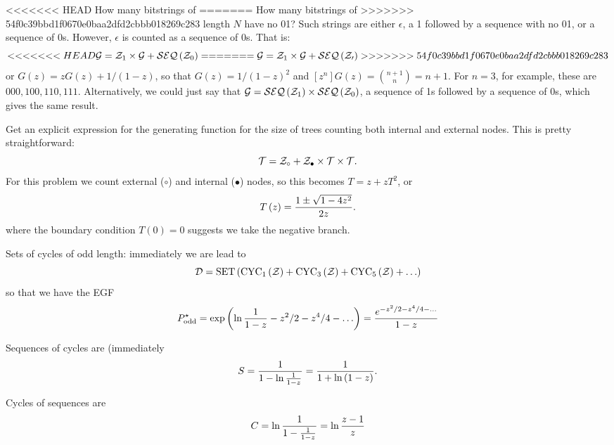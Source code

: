 <<<<<<< HEAD
\vskip 0.08in  How many bitstrings of
=======
\vskip 0.08in  How many bitstrings of
>>>>>>> 54f0c39bbd1f0670e0baa2dfd2cbbb018269c283
length $N$ have no 01?\hfil\break
Such strings are either $\epsilon$, a 1 followed by a sequence with no 01,
or a sequence of 0s.  However, $\epsilon$ is counted as a sequence of 0s. That is:
$$
<<<<<<< HEAD
 {\cal G} = {\cal Z}_1 \times {\cal G} + {\cal SEQ}\left({\cal Z}_0\right)
=======
 {\cal G} = {\cal Z}_1 \times {\cal G} + {\cal SEQ}\left({\cal Z_0}\right)
>>>>>>> 54f0c39bbd1f0670e0baa2dfd2cbbb018269c283
$$
or $G\left(z\right) = z G\left(z\right) + 1 /\left( 1 - z \right) $, so that
$G\left(z\right) = 1 / \left(1 - z\right)^2$ and $\left[z^n\right] G\left(z\right) =
{n + 1 \choose n} = n + 1$.  For $n=3$, for example, these are
$000, 100, 110, 111$.  Alternatively, we could just say that
${\cal G} = {\cal SEQ}\left({\cal Z}_1\right) \times {\cal SEQ}\left({\cal Z}_0\right)$,
a sequence of 1s followed by a sequence of 0s, which gives the same result.

\vskip 0.08in  Get an explicit expression for the 
generating function for the size of trees counting both internal and external nodes.
This is pretty straightforward: 
$$
 {\cal T} = {\cal Z}_{\circ} + {\cal Z}_{\bullet} \times {\cal T} \times {\cal T}.
$$
For this problem we count external ($\circ$) and internal ($\bullet$) nodes,
so this becomes $T = z + z T^2$, or
$$
 T\left(z\right) = {1 \pm \sqrt{1 - 4 z^2} \over 2 z}.
$$
where the boundary condition $T\left(0\right) = 0$ suggests we take the negative branch.

\vskip 0.08in  Sets of cycles of odd length:
immediately we are lead to 
$$
{\cal D} = {\rm SET} \left(
{\rm CYC}_1\left({\cal Z}\right) + {\rm CYC}_3 \left({\cal Z}\right) +
 {\rm CYC}_5 \left({\cal Z}\right) + \ldots \right)
 $$
 so that we have the EGF
 $$
 P^{\star}_{\rm odd} = \exp \left( \ln {1 \over 1 - z } - z^2/2 - z^4/4 - \ldots\right)
  = { e^{-z^2/2 - z^4/4 - \ldots} \over 1 - z }
$$

\vskip 0.08in  Sequences of cycles are (immediately
$$
  S = {1 \over {1 - \ln {1 \over 1 - z}}} = {1 \over 1 + \ln \left(1 - z\right)}.
$$

\vskip 0.08in  Cycles of sequences are
$$
 C = \ln {1 \over {1 - {1 \over 1 - z}}} = \ln {z - 1 \over z}
$$

